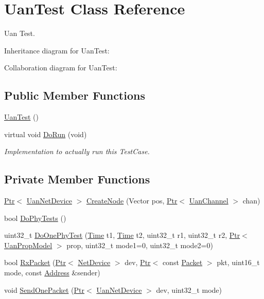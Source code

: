 \hypertarget{classUanTest}{}\section{Uan\+Test Class Reference}
\label{classUanTest}


Uan Test.  




Inheritance diagram for Uan\+Test\+:


Collaboration diagram for Uan\+Test\+:
\subsection*{Public Member Functions}
\begin{DoxyCompactItemize}
\item 
\hyperlink{classUanTest_ab763d61d2c70ccadc7db53133b8ae167}{Uan\+Test} ()
\item 
virtual void \hyperlink{classUanTest_a10e0eae23696e9000dbea6e3d9a1f0ba}{Do\+Run} (void)
\begin{DoxyCompactList}\small\item\em Implementation to actually run this Test\+Case. \end{DoxyCompactList}\end{DoxyCompactItemize}
\subsection*{Private Member Functions}
\begin{DoxyCompactItemize}
\item 
\hyperlink{classns3_1_1Ptr}{Ptr}$<$ \hyperlink{classns3_1_1UanNetDevice}{Uan\+Net\+Device} $>$ \hyperlink{classUanTest_a4439b6676512b774fb9b2f2f0dd4cfce}{Create\+Node} (Vector pos, \hyperlink{classns3_1_1Ptr}{Ptr}$<$ \hyperlink{classns3_1_1UanChannel}{Uan\+Channel} $>$ chan)
\item 
bool \hyperlink{classUanTest_af3bcfdc5efa92b7be46d78edf9f05931}{Do\+Phy\+Tests} ()
\item 
uint32\+\_\+t \hyperlink{classUanTest_a006331b086a052683abed216dc67dd8d}{Do\+One\+Phy\+Test} (\hyperlink{classns3_1_1Time}{Time} t1, \hyperlink{classns3_1_1Time}{Time} t2, uint32\+\_\+t r1, uint32\+\_\+t r2, \hyperlink{classns3_1_1Ptr}{Ptr}$<$ \hyperlink{classns3_1_1UanPropModel}{Uan\+Prop\+Model} $>$ prop, uint32\+\_\+t mode1=0, uint32\+\_\+t mode2=0)
\item 
bool \hyperlink{classUanTest_a19e9722f108328ea50b1b578c7ab36eb}{Rx\+Packet} (\hyperlink{classns3_1_1Ptr}{Ptr}$<$ \hyperlink{classns3_1_1NetDevice}{Net\+Device} $>$ dev, \hyperlink{classns3_1_1Ptr}{Ptr}$<$ const \hyperlink{classns3_1_1Packet}{Packet} $>$ pkt, uint16\+\_\+t mode, const \hyperlink{classns3_1_1Address}{Address} \&sender)
\item 
void \hyperlink{classUanTest_ab0fd9a9d83e8cb6a1fc88f3a3b0e2f88}{Send\+One\+Packet} (\hyperlink{classns3_1_1Ptr}{Ptr}$<$ \hyperlink{classns3_1_1UanNetDevice}{Uan\+Net\+Device} $>$ dev, uint32\+\_\+t mode)
\end{DoxyCompactItemize}
